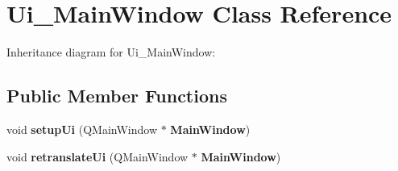 \section{Ui\+\_\+\+Main\+Window Class Reference}
\label{class_ui___main_window}


Inheritance diagram for Ui\+\_\+\+Main\+Window\+:
\subsection*{Public Member Functions}
\begin{DoxyCompactItemize}
\item 
\mbox{\label{class_ui___main_window_acf4a0872c4c77d8f43a2ec66ed849b58}} 
void {\bfseries setup\+Ui} (Q\+Main\+Window $\ast$\textbf{ Main\+Window})
\item 
\mbox{\label{class_ui___main_window_a097dd160c3534a204904cb374412c618}} 
void {\bfseries retranslate\+Ui} (Q\+Main\+Window $\ast$\textbf{ Main\+Window})
\end{DoxyCompactItemize}
